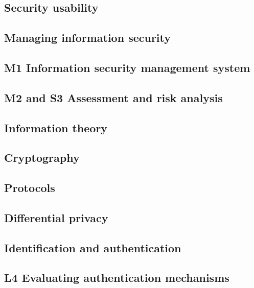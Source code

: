 \subsection{Security usability}


\subsection{Managing information security}


\subsection{M1 Information security management system}


\subsection{M2 and S3 Assessment and risk analysis}


\subsection{Information theory}


\subsection{Cryptography}


\subsection{Protocols}


\subsection{Differential privacy}


\subsection{Identification and authentication}


\subsection{L4 Evaluating authentication mechanisms}


